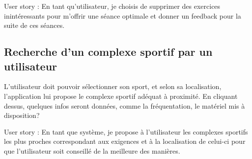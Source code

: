 \begin{itshape}
User story : En tant qu'utilisateur, je choisis de supprimer des exercices inintéressants pour m'offrir une séance optimale et donner un feedback pour la suite de ces séances.
\end{itshape}

\subsection{Recherche d'un complexe sportif par un utilisateur}

L'utilisateur doit pouvoir sélectionner son sport, et selon sa localisation, l'application lui propose le complexe sportif adéquat à proximité. En cliquant dessus, quelques infos seront données, comme la fréquentation, le matériel mis à disposition?\\

\begin{itshape}
User story : En tant que système, je propose à l'utilisateur les complexes sportifs les plus proches correspondant aux exigences et à la localisation de celui-ci pour que l'utilisateur soit conseillé de la meilleure des manières.

\end{itshape}
